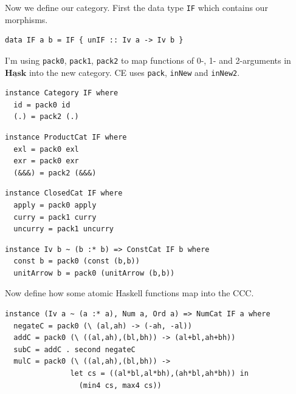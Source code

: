\documentclass[10pt]{beamer}
\newcommand{\Cat}[1]{\ensuremath{\underline{\mathbf{#1}}}}
\theoremstyle{definition}
\theoremstyle{remark}
\numberwithin{equation}{section}
\begin{document}
\begin{frame}[fragile]{}
  Now we define our category. First the data type \lstinline{IF} which contains our morphisms.
  \begin{lstlisting}[frame=single]
    data IF a b = IF { unIF :: Iv a -> Iv b }
  \end{lstlisting}
\end{frame}

\begin{frame}[fragile]{}
  I'm using \lstinline{pack0}, \lstinline{pack1}, \lstinline{pack2} to map functions of 0-, 1- and 2-arguments in $\Cat{Hask}$ into the new category. CE uses \lstinline{pack}, \lstinline{inNew} and \lstinline{inNew2}.
  \begin{lstlisting}[frame=single]
instance Category IF where
  id = pack0 id
  (.) = pack2 (.)
  \end{lstlisting}
\end{frame}

\begin{frame}[fragile]{}
  \begin{lstlisting}[frame=single]
instance ProductCat IF where
  exl = pack0 exl
  exr = pack0 exr
  (&&&) = pack2 (&&&)
  \end{lstlisting}
\end{frame}

\begin{frame}[fragile]{}
  \begin{lstlisting}[frame=single]
instance ClosedCat IF where
  apply = pack0 apply
  curry = pack1 curry
  uncurry = pack1 uncurry
  \end{lstlisting}
\end{frame}

\begin{frame}[fragile]{}
  \begin{lstlisting}[frame=single]
instance Iv b ~ (b :* b) => ConstCat IF b where
  const b = pack0 (const (b,b))
  unitArrow b = pack0 (unitArrow (b,b))
  \end{lstlisting}
\end{frame}


\begin{frame}[fragile]{}
  Now define how some atomic Haskell functions map into the CCC.
  \begin{lstlisting}[frame=single]
instance (Iv a ~ (a :* a), Num a, Ord a) => NumCat IF a where
  negateC = pack0 (\ (al,ah) -> (-ah, -al))
  addC = pack0 (\ ((al,ah),(bl,bh)) -> (al+bl,ah+bh))
  subC = addC . second negateC
  mulC = pack0 (\ ((al,ah),(bl,bh)) ->
               let cs = ((al*bl,al*bh),(ah*bl,ah*bh)) in
                 (min4 cs, max4 cs))
  \end{lstlisting}
\end{frame}
\end{document}
